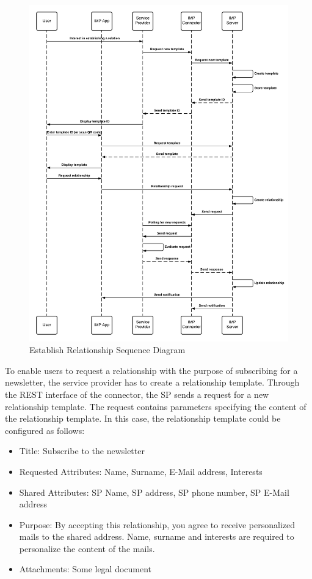 \begin{figure}[H]
    \centering
    \includegraphics[scale=0.6]{Diagrams/IMP Use Case Establish Relationship Sequence Diagram.pdf}
    \caption{Establish Relationship Sequence Diagram}
    \label{imp:establish_relationship}
\end{figure}

To enable users to request a relationship with the purpose of subscribing for a newsletter, the service provider has to create a relationship template. Through the REST interface of the connector, the SP sends a request for a new relationship template. The request contains parameters specifying the content of the relationship template. In this case, the relationship template could be configured as follows:

\begin{itemize}
    \item Title: Subscribe to the newsletter
    \item Requested Attributes: Name, Surname, E-Mail address, Interests
    \item Shared Attributes: SP Name, SP address, SP phone number, SP E-Mail address
    \item Purpose: By accepting this relationship, you agree to receive personalized mails to the shared address. Name, surname and interests are required to personalize the content of the mails.
    \item Attachments: Some legal document
\end{itemize}

